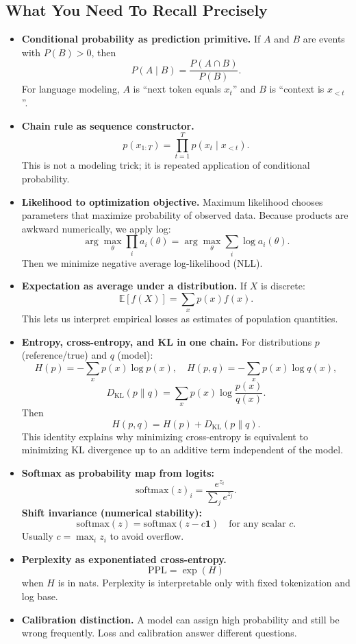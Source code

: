 \subsection*{What You Need To Recall Precisely}
\begin{itemize}[leftmargin=1.5em]
  \item \textbf{Conditional probability as prediction primitive.} If $A$ and $B$ are events with $P(B)>0$, then
  \[
    P(A\mid B)=\frac{P(A\cap B)}{P(B)}.
  \]
  For language modeling, $A$ is ``next token equals $x_t$'' and $B$ is ``context is $x_{<t}$''.

  \item \textbf{Chain rule as sequence constructor.}
  \[
    p(x_{1:T}) = \prod_{t=1}^{T} p(x_t \mid x_{<t}).
  \]
  This is not a modeling trick; it is repeated application of conditional probability.

  \item \textbf{Likelihood to optimization objective.} Maximum likelihood chooses parameters that maximize probability of observed data. Because products are awkward numerically, we apply log:
  \[
    \arg\max_\theta \prod_i a_i(\theta)=\arg\max_\theta \sum_i \log a_i(\theta).
  \]
  Then we minimize negative average log-likelihood (NLL).

  \item \textbf{Expectation as average under a distribution.} If $X$ is discrete:
  \[
    \mathbb{E}[f(X)] = \sum_x p(x)f(x).
  \]
  This lets us interpret empirical losses as estimates of population quantities.

  \item \textbf{Entropy, cross-entropy, and KL in one chain.}
  For distributions $p$ (reference/true) and $q$ (model):
  \[
    H(p) = -\sum_x p(x)\log p(x),\quad
    H(p,q) = -\sum_x p(x)\log q(x),
  \]
  \[
    D_{\mathrm{KL}}(p\|q)=\sum_x p(x)\log\frac{p(x)}{q(x)}.
  \]
  Then
  \[
    H(p,q) = H(p) + D_{\mathrm{KL}}(p\|q).
  \]
  This identity explains why minimizing cross-entropy is equivalent to minimizing KL divergence up to an additive term independent of the model.

  \item \textbf{Softmax as probability map from logits:}
  \[
    \mathrm{softmax}(z)_i = \frac{e^{z_i}}{\sum_j e^{z_j}}.
  \]
  \textbf{Shift invariance (numerical stability):}
  \[
    \mathrm{softmax}(z) = \mathrm{softmax}(z - c\mathbf{1}) \quad \text{for any scalar } c.
  \]
\nobreak
  Usually $c=\max_i z_i$ to avoid overflow.

  \item \textbf{Perplexity as exponentiated cross-entropy.}
  \[
    \mathrm{PPL}=\exp(H)
  \]
  when $H$ is in nats. Perplexity is interpretable only with fixed tokenization and log base.

  \item \textbf{Calibration distinction.} A model can assign high probability and still be wrong frequently. Loss and calibration answer different questions.
\end{itemize}

